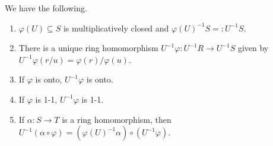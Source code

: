 \begin{proposition}\label{3.6}
    We have the following.
    \begin{enumerate}
        \item\label{3.6a} $\varphi(U) \subseteq S$ is multiplicatively closed and $\varphi(U)^{-1}S =: U^{-1}S$.
        \item\label{3.6b} There is a unique ring homomorphism $U^{-1}\varphi: U^{-1}R \to U^{-1}S$ given by $U^{-1}\varphi(r/u) = \varphi(r)/\varphi(u)$.
            \begin{center}
            \end{center}
        \item\label{3.6c} If $\varphi$ is onto, $U^{-1}\varphi$ is onto.
        \item\label{3.6d} If $\varphi$ is 1-1, $U^{-1}\varphi$ is 1-1.
        \item\label{3.6e} If $\alpha: S \to T$ is a ring homomorphism, then $U^{-1}(\alpha \circ \varphi) = (\varphi(U)^{-1}\alpha) \circ (U^{-1}\varphi)$. 
            \begin{center}
            \end{center}
    \end{enumerate}
\end{proposition}

